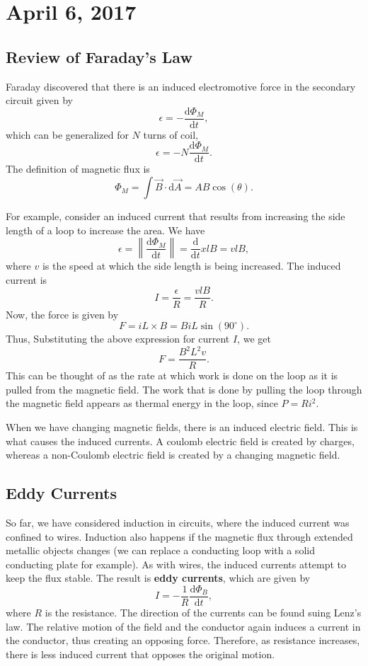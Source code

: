 \documentclass[11pt]{article}
\theoremstyle{plain} %
\theoremstyle{definition}
\theoremstyle{example}
\theoremstyle{remark}
\begin{document}
\section{April 6, 2017}
\subsection{Review of Faraday's Law}
Faraday discovered that there is an induced electromotive force in the secondary circuit given by 
$$\epsilon = -\frac{\mathrm d \Phi_M}{\mathrm d t},$$
which can be generalized for $N$ turns of coil,
$$\epsilon = -N\frac{\mathrm d \Phi_M}{\mathrm d t}.$$
The definition of magnetic flux is 
$$\Phi_M = \int\vec{B}\cdot \mathrm d \vec{A} = AB\cos(\theta).$$

For example, consider an induced current that results from increasing the side length of a loop to increase the area. We have 
$$\epsilon = \left\|\frac{\mathrm d \Phi_M}{\mathrm d t}\right\| = \frac{\mathrm d}{\mathrm d t}xlB = vlB,$$
where $v$ is the speed at which the side length is being increased. The induced current is $$I = \frac{\epsilon}{R} =\frac{vlB}{R}.$$
Now, the force is given by $$F = iL\times B = BiL\sin\left(90^{\circ}\right).$$
Thus, Substituting the above expression for current $I$, we get
$$F = \frac{B^2L^2v}{R}.$$
This can be thought of as the rate at which work is done on the loop as it is pulled from the magnetic field. The work that is done by pulling the loop through the magnetic field appears as thermal energy in the loop, since $P=Ri^2$. 

When we have changing magnetic fields, there is an induced electric field. This is what causes the induced currents. A coulomb electric field is created by charges, whereas a non-Coulomb electric field is created by a changing magnetic field. 

\subsection{Eddy Currents}
So far, we have considered induction in circuits, where the induced current was confined to wires. Induction also happens if the magnetic flux through extended metallic objects changes (we can replace a conducting loop with a solid conducting plate for example). As with wires, the induced currents attempt to keep the flux stable. The result is \textbf{eddy currents}, which are given by 
$$I = -\frac{1}{R}\frac{\mathrm d \Phi_B}{\mathrm d t},$$
where $R$ is the resistance. The direction of the currents can be found suing Lenz's law. The relative motion of the field and the conductor again induces a current in the conductor, thus creating an opposing force. Therefore, as resistance increases, there is less induced current that opposes the original motion. 
\end{document}
